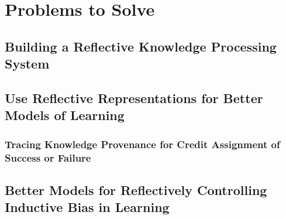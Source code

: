 \chapter{Problems to Solve}\label{ch:problems_to_solve}

\section{Building a Reflective Knowledge Processing System}



\section{Use Reflective Representations for Better Models of Learning}

\subsection{Tracing Knowledge Provenance for Credit Assignment of Success or Failure}

\section{Better Models for Reflectively Controlling Inductive Bias in Learning}


